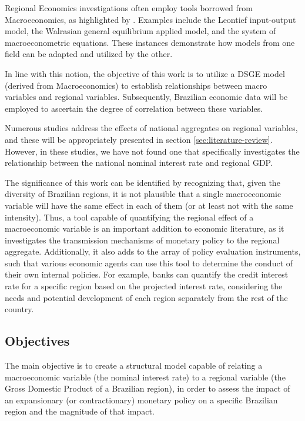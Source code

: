 \documentclass[
thesis.tex
]{subfiles}
\begin{document}
	Regional Economics investigations often employ tools borrowed from Macroeconomics, as highlighted by \textcite{rickman_modern_2010}. Examples include the Leontief input-output model, the Walrasian general equilibrium applied model, and the system of macroeconometric equations. These instances demonstrate how models from one field can be adapted and utilized by the other.
	
	In line with this notion, the objective of this work is to utilize a DSGE model (derived from Macroeconomics) to establish relationships between macro variables and regional variables. Subsequently, Brazilian economic data will be employed to ascertain the degree of correlation between these variables.
	
	Numerous studies address the effects of national aggregates on regional variables, and these will be appropriately presented in section \ref{sec:literature-review}. However, in these studies, we have not found one that specifically investigates the relationship between the national nominal interest rate and regional GDP.
	
	The significance of this work can be identified by recognizing that, given the diversity of Brazilian regions, it is not plausible that a single macroeconomic variable will have the same effect in each of them (or at least not with the same intensity). Thus, a tool capable of quantifying the regional effect of a macroeconomic variable is an important addition to economic literature, as it investigates the transmission mechanisms of monetary policy to the regional aggregate. Additionally, it also adds to the array of policy evaluation instruments, such that various economic agents can use this tool to determine the conduct of their own internal policies. For example, banks can quantify the credit interest rate for a specific region based on the projected interest rate, considering the needs and potential development of each region separately from the rest of the country.
	
	\subsection*{Objectives}
	
	The main objective is to create a structural model capable of relating a macroeconomic variable (the nominal interest rate) to a regional variable (the Gross Domestic Product of a Brazilian region), in order to assess the impact of an expansionary (or contractionary) monetary policy on a specific Brazilian region and the magnitude of that impact.
	
\end{document}
